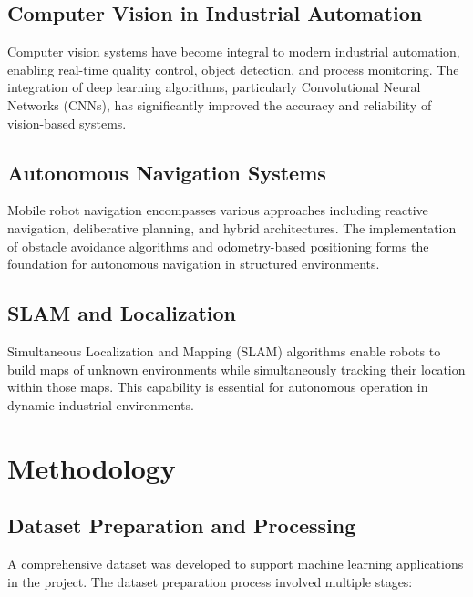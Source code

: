 \documentclass{book}
\begin{document}
\section{Computer Vision in Industrial Automation}

\par\noindent Computer vision systems have become integral to modern industrial automation, enabling real-time quality control, object detection, and process monitoring. The integration of deep learning algorithms, particularly Convolutional Neural Networks (CNNs), has significantly improved the accuracy and reliability of vision-based systems.

\section{Autonomous Navigation Systems}

\par\noindent Mobile robot navigation encompasses various approaches including reactive navigation, deliberative planning, and hybrid architectures. The implementation of obstacle avoidance algorithms and odometry-based positioning forms the foundation for autonomous navigation in structured environments.

\section{SLAM and Localization}

\par\noindent Simultaneous Localization and Mapping (SLAM) algorithms enable robots to build maps of unknown environments while simultaneously tracking their location within those maps. This capability is essential for autonomous operation in dynamic industrial environments.

\chapter{Methodology}

\section{Dataset Preparation and Processing}

\par\noindent A comprehensive dataset was developed to support machine learning applications in the project. The dataset preparation process involved multiple stages:
\end{document}
